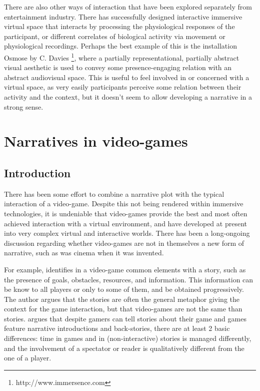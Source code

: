 \documentclass[
		twoside,openright,titlepage,numbers=noenddot,manychapters,
		headinclude,%
                footinclude=false,cleardoublepage=empty,
                BCOR=5mm,
		fontsize=11pt, %
                 enabledeprecatedfontcommands]{scrreprt}
\begin{document}
There are also other ways of interaction that have been explored separately from entertainment industry.  There has successfully designed interactive immersive virtual space that interacts by processing the physiological responses of the participant, or different correlates of biological activity via movement or physiological recordings. Perhaps the best example of this is the installation Osmose by C. Davies \footnote{ http://www.immersence.com }, where a partially representational, partially abstract visual aesthetic is used to convey some presence-engaging relation with an abstract audiovisual space. This is useful to feel involved in or concerned with a virtual space, as very easily participants perceive some relation between their activity and the context, but it doesn't seem to allow developing a narrative in a strong sense.




\section{Narratives in video-games}
\label{sec_video}
\subsection{Introduction}
There has been some effort to combine a narrative plot with the typical interaction of a video-game. Despite this not being rendered within immersive technologies, it is undeniable that video-games provide the best and most often achieved interaction with a virtual environment, and have developed at present into very complex virtual and interactive worlds. There has been a long-ongoing discussion regarding whether video-games are not in themselves a new form of narrative, such as was cinema when it was invented. 

For example, \cite{pearce2002story} identifies in a video-game common elements with a story, such as the presence of goals, obstacles, resources, and information. This information  can be know to all players or only to some of them, and be obtained progressively. The author argues that the stories are often the general metaphor giving the context for the game interaction, but that video-games  are not the same than stories. \cite{juul2001games} argues that despite gamers can tell stories about their game and games feature narrative introductions and back-stories, there are at least 2 basic differences: time in games and in (non-interactive) stories is managed differently, and the involvement of a spectator or reader is qualitatively different from the one of a player.
\end{document}
